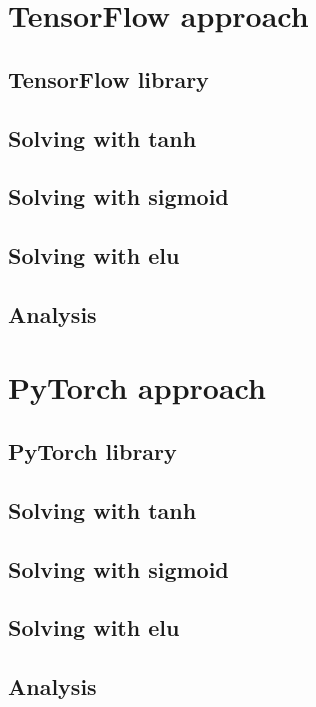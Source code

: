 \section{TensorFlow approach}
\subsection{TensorFlow library}
\subsection{Solving with tanh}



\subsection{Solving with sigmoid}



\subsection{Solving with elu}


\subsection{Analysis}


\section{PyTorch approach}
\subsection{PyTorch library}



\subsection{Solving with tanh}



\subsection{Solving with sigmoid}



\subsection{Solving with elu}




\subsection{Analysis}
